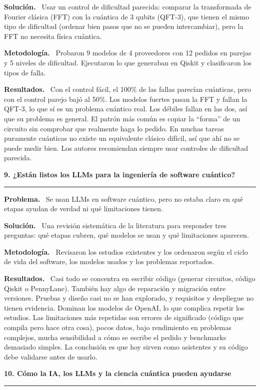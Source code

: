 \documentclass[11pt,a4paper]{article}
\newcommand{\paper}[1]{\vspace{1.2em}\par{\large\textbf{#1}}\par\vspace{0.2em}\hrule\vspace{0.4em}}
\newcommand{\parte}[1]{\par\textbf{#1.}\ }
\begin{document}
\parte{Solución}
Usar un control de dificultad parecida: comparar la transformada de Fourier clásica (FFT) con la cuántica de 3 qubits (QFT-3), que tienen el mismo tipo de dificultad (ordenar bien pasos que no se pueden intercambiar), pero la FFT no necesita física cuántica.

\parte{Metodología}
Probaron 9 modelos de 4 proveedores con 12 pedidos en parejas y 5 niveles de dificultad. Ejecutaron lo que generaban en Qiskit y clasificaron los tipos de falla.

\parte{Resultados}
Con el control fácil, el 100\% de las fallas parecían cuánticas, pero con el control parejo bajó al 50\%. Los modelos fuertes pasan la FFT y fallan la QFT-3, lo que sí es un problema cuántico real. Los débiles fallan en las dos, así que su problema es general. El patrón más común es copiar la ``forma'' de un circuito sin comprobar que realmente haga lo pedido. En muchas tareas puramente cuánticas no existe un equivalente clásico difícil, así que ahí no se puede medir bien. Los autores recomiendan siempre usar controles de dificultad parecida.

\paper{9. ¿Están listos los LLMs para la ingeniería de software cuántico?}

\parte{Problema}
Se usan LLMs en software cuántico, pero no estaba claro en qué etapas ayudan de verdad ni qué limitaciones tienen.

\parte{Solución}
Una revisión sistemática de la literatura para responder tres preguntas: qué etapas cubren, qué modelos se usan y qué limitaciones aparecen.

\parte{Metodología}
Revisaron los estudios existentes y los ordenaron según el ciclo de vida del software, los modelos usados y los problemas reportados.

\parte{Resultados}
Casi todo se concentra en escribir código (generar circuitos, código Qiskit o PennyLane). También hay algo de reparación y migración entre versiones. Pruebas y diseño casi no se han explorado, y requisitos y despliegue no tienen evidencia. Dominan los modelos de OpenAI, lo que complica repetir los estudios. Las limitaciones más repetidas son errores de significado (código que compila pero hace otra cosa), pocos datos, bajo rendimiento en problemas complejos, mucha sensibilidad a cómo se escribe el pedido y benchmarks demasiado simples. La conclusión es que hoy sirven como asistentes y su código debe validarse antes de usarlo.

\paper{10. Cómo la IA, los LLMs y la ciencia cuántica pueden ayudarse}
\end{document}
